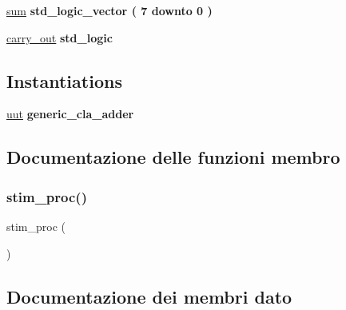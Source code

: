 \begin{DoxyCompactItemize}
\item 
\hyperlink{classtb__generic__cla__adder_1_1behavior_a2f702f7ff5535941ec77a2859f9686b7}{sum} {\bfseries \textcolor{vhdlchar}{std\+\_\+logic\+\_\+vector}\textcolor{vhdlchar}{ }\textcolor{vhdlchar}{(}\textcolor{vhdlchar}{ }\textcolor{vhdlchar}{ } \textcolor{vhdldigit}{7} \textcolor{vhdlchar}{ }\textcolor{vhdlchar}{downto}\textcolor{vhdlchar}{ }\textcolor{vhdlchar}{ } \textcolor{vhdldigit}{0} \textcolor{vhdlchar}{ }\textcolor{vhdlchar}{)}\textcolor{vhdlchar}{ }} 
\item 
\hyperlink{classtb__generic__cla__adder_1_1behavior_a0599dd129c582752ab70084bd7bd6305}{carry\+\_\+out} {\bfseries \textcolor{vhdlchar}{std\+\_\+logic}\textcolor{vhdlchar}{ }} 
\end{DoxyCompactItemize}
\subsection*{Instantiations}
 \begin{DoxyCompactItemize}
\item 
\hyperlink{classtb__generic__cla__adder_1_1behavior_a1619316ad715601eb5d3559db829ac05}{uut}  {\bfseries generic\+\_\+cla\+\_\+adder}   
\end{DoxyCompactItemize}


\subsection{Documentazione delle funzioni membro}
\mbox{\label{classtb__generic__cla__adder_1_1behavior_ad2efa6785cff833c341e27596b21aeb5}} 
\subsubsection{\texorpdfstring{stim\+\_\+proc()}{stim\_proc()}}
{\footnotesize\ttfamily stim\+\_\+proc (\begin{DoxyParamCaption}{ }\end{DoxyParamCaption})}



\subsection{Documentazione dei membri dato}
\mbox{\label{classtb__generic__cla__adder_1_1behavior_a674dc264b83bd397c51160bed4eaede8}} 

